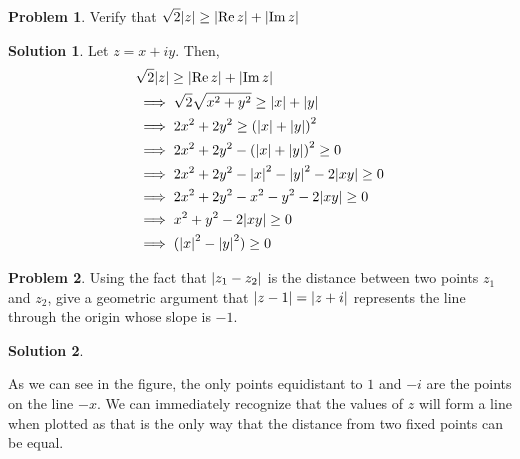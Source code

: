 \documentclass[10pt]{article}
\theoremstyle{definition}
\newtheorem{problem}{Problem}
\newtheorem{soln}{Solution}
\begin{document}
\begin{problem}
Verify that $\displaystyle\sqrt{2}\abs{z}\geq \abs{\Re z} +\abs{\Im z}$
\end{problem}
\begin{soln}
  Let $z=x+iy$. Then,
  \begin{align*}
     & \sqrt{2}\abs{z}        \geq  \abs{\Re z} +\abs{\Im z}                      \\
     & \implies \sqrt{2}\sqrt{x^2+y^2}  \geq  \abs{x} +\abs{y}                    \\
     & \implies 2x^2+2y^2               \geq  \left(\abs{x} +\abs{y}\right)^2     \\
     & \implies 2x^2+2y^2 - \left(\abs{x} +\abs{y}\right)^2               \geq  0 \\
     & \implies 2x^2+2y^2 - \abs{x}^2-\abs{y}^2-2\abs{xy}               \geq  0   \\
     & \implies 2x^2+2y^2 - x^2-y^2-2\abs{xy}               \geq  0               \\
     & \implies x^2+y^2-2\abs{xy}               \geq  0                           \\
     & \implies (\abs{x}^2-\abs{y}^2)               \geq  0
  \end{align*}
\end{soln}
\newpage

\begin{problem}
Using the fact that $\abs{z_1-z_2}$ is the distance between two points $z_1$ and $z_2$, give a geometric
argument that $\abs{z-1}=\abs{z+i}$ represents the line through the origin whose slope is $-1$.
\end{problem}
\begin{soln}~\\
  \begin{center}
  \end{center}
  As we can see in the figure, the only points equidistant to $1$ and $-i$ are the points on the line $-x$. We can immediately recognize that the values of $z$
  will form a line when plotted as that is the only way that the distance from two fixed points can be equal.
\end{soln}
\end{document}
